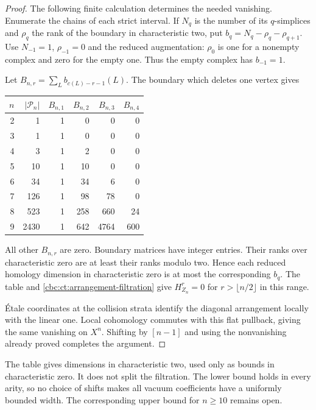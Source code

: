 \begin{proof}
The following finite calculation determines the needed
vanishing. Enumerate the chains of each strict interval. If
$N_q$ is the number of its $q$-simplices and $\rho_q$ the
rank of the boundary in characteristic two, put
$b_q=N_q-\rho_q-\rho_{q+1}$. Use $N_{-1}=1$, $\rho_{-1}=0$
and the reduced augmentation: $\rho_0$ is one for a nonempty
complex and zero for the empty one. Thus the empty complex
has $b_{-1}=1$.

Let
$B_{n,r}=\sum_L b_{c(L)-r-1}(L)$. The boundary which deletes
one vertex gives
\begin{center}
\begin{tabular}{r|r|rrrr}
\toprule
$n$&$|\mathcal P_n|$&$B_{n,1}$&$B_{n,2}$&$B_{n,3}$&$B_{n,4}$\\
\midrule
2&1&1&0&0&0\\
3&1&1&0&0&0\\
4&3&1&2&0&0\\
5&10&1&10&0&0\\
6&34&1&34&6&0\\
7&126&1&98&78&0\\
8&523&1&258&660&24\\
9&2430&1&642&4764&600\\
\bottomrule
\end{tabular}
\end{center}
All other $B_{n,r}$ are zero. Boundary matrices have integer
entries. Their ranks over characteristic zero are at least
their ranks modulo two. Hence each reduced homology dimension
in characteristic zero is at most the corresponding $b_q$.
The table and \eqref{cbc:ct:arrangement-filtration} give
$H^r_{Z_n}=0$ for $r>\lfloor n/2\rfloor$ in this range.

\'Etale coordinates at the collision strata identify the
diagonal arrangement locally with the linear one. Local
cohomology commutes with this flat pullback, giving the same
vanishing on $X^n$. Shifting by $[n-1]$ and using the
nonvanishing already proved completes the argument.
\end{proof}

The table gives dimensions in characteristic two, used only
as bounds in characteristic zero. It does not split the
filtration. The lower bound holds in every arity, so no
choice of shifts makes all vacuum coefficients have a
uniformly bounded width. The corresponding upper bound for
$n\geq10$ remains open.
